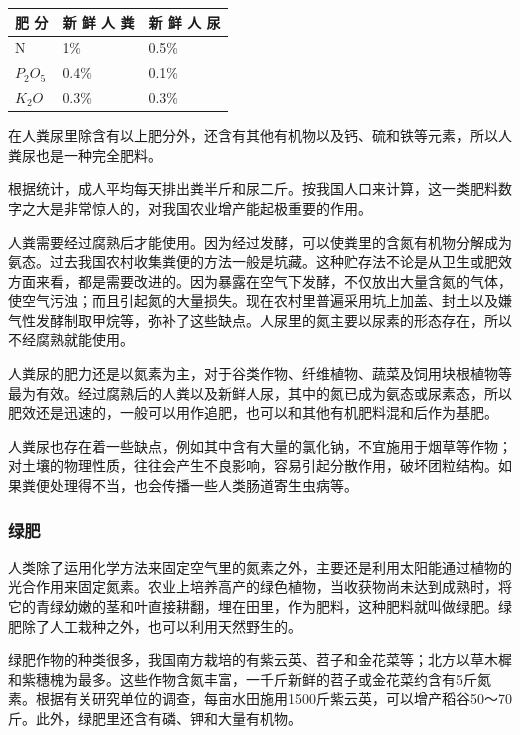 {\def\LTcaptype{none} %
\begin{longtable}[]{@{}lll@{}}
\toprule\noalign{}
肥 分 & 新 鲜 人 粪 & 新 鲜 人 尿 \\
\midrule\noalign{}
\endhead
\bottomrule\noalign{}
\endlastfoot
N & 1\% & 0.5\% \\
\(P_2O_5\) & 0.4\% & 0.1\% \\
\(K_2O\) & 0.3\% & 0.3\% \\
\end{longtable}
}

在人粪尿里除含有以上肥分外，还含有其他有机物以及钙、硫和铁等元素，所以人粪尿也是一种完全肥料。

根据统计，成人平均每天排出粪半斤和尿二斤。按我国人口来计算，这一类肥料数字之大是非常惊人的，对我国农业增产能起极重要的作用。

人粪需要经过腐熟后才能使用。因为经过发酵，可以使粪里的含氮有机物分解成为氨态。过去我国农村收集粪便的方法一般是坑藏。这种贮存法不论是从卫生或肥效方面来看，都是需要改进的。因为暴露在空气下发酵，不仅放出大量含氮的气体，使空气污浊；而且引起氮的大量损失。现在农村里普遍采用坑上加盖、封土以及嫌气性发酵制取甲烷等，弥补了这些缺点。人尿里的氮主要以尿素的形态存在，所以不经腐熟就能使用。

人粪尿的肥力还是以氮素为主，对于谷类作物、纤维植物、蔬菜及饲用块根植物等最为有效。经过腐熟后的人粪以及新鲜人尿，其中的氮已成为氨态或尿素态，所以肥效还是迅速的，一般可以用作追肥，也可以和其他有机肥料混和后作为基肥。

人粪尿也存在着一些缺点，例如其中含有大量的氯化钠，不宜施用于烟草等作物；对土壤的物理性质，往往会产生不良影响，容易引起分散作用，破坏团粒结构。如果粪便处理得不当，也会传播一些人类肠道寄生虫病等。

\subsubsection{绿肥}

人类除了运用化学方法来固定空气里的氮素之外，主要还是利用太阳能通过植物的光合作用来固定氮素。农业上培养高产的绿色植物，当收获物尚未达到成熟时，将它的青绿幼嫩的茎和叶直接耕翻，埋在田里，作为肥料，这种肥料就叫做绿肥。绿肥除了人工栽种之外，也可以利用天然野生的。

绿肥作物的种类很多，我国南方栽培的有紫云英、苕子和金花菜等；北方以草木樨和紫穗槐为最多。这些作物含氮丰富，一千斤新鲜的苕子或金花菜约含有5斤氮素。根据有关研究单位的调查，每亩水田施用1500斤紫云英，可以增产稻谷50～70斤。此外，绿肥里还含有磷、钾和大量有机物。

